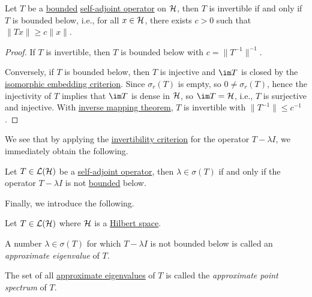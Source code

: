 \begin{lemma}\label{lma:invertibility-criterion}
	Let \(T\) be a \hyperref[rmk:bounded-op]{bounded} \hyperref[def:self-adjoint-op]{self-adjoint operator} on \(\mathcal{\MakeUppercase{h}} \), then \(T\) is invertible if and only if \(T\) is bounded below, i.e., for all \(x\in \mathcal{\MakeUppercase{h}} \), there exists \(c>0\) such that \(\lVert Tx \rVert \geq c\lVert x \rVert \).
\end{lemma}
\begin{proof}
	If \(T\) is invertible, then \(T\) is bounded below with \(c = \lVert T^{-1}  \rVert ^{-1} \).

	Conversely, if \(T\) is bounded below, then \(T\) is injective and \(\im T\) is closed by the \hyperref[prop:isomorphic-embedding]{isomorphic embedding criterion}. Since \(\sigma _r(T)\) is empty, so \(0 \neq \sigma _r(T)\), hence the injectivity of \(T\) implies that \(\im T\) is dense in \(\mathcal{\MakeUppercase{h}} \), so \(\im T=\mathcal{\MakeUppercase{h}} \), i.e., \(T\) is surjective and injective. With \hyperref[thm:inverse-mapping]{inverse mapping theorem}, \(T\) is invertible with \(\lVert T^{-1}  \rVert \leq c^{-1} \).
\end{proof}

We see that by applying the \hyperref[lma:invertibility-criterion]{invertibility criterion} for the operator \(T - \lambda I\), we immediately obtain the following.

\begin{corollary}\label{col:criterion-of-spectrum-points}
	Let \(T\in \mathcal{\MakeUppercase{l}} (\mathcal{\MakeUppercase{h}} )\) be a \hyperref[def:self-adjoint-op]{self-adjoint operator}, then \(\lambda \in \sigma (T)\) if and only if the operator \(T - \lambda I\) is not \hyperref[rmk:bounded-op]{bounded} below.
\end{corollary}

Finally, we introduce the following.

\begin{definition*}
	Let \(T\in \mathcal{\MakeUppercase{l}} (\mathcal{\MakeUppercase{h}} )\) where \(\mathcal{\MakeUppercase{h}} \) is a \hyperref[def:Hilbert-space]{Hilbert space}.
	\begin{definition}\label{def:approximate-eigenvalue}
		A number \(\lambda \in \sigma (T)\) for which \(T - \lambda I\) is not bounded below is called an \emph{approximate eigenvalue} of \(T\).
	\end{definition}
	\begin{definition}\label{def:approximate-point-spectrum}
		The set of all \hyperref[def:approximate-eigenvalue]{approximate eigenvalues} of \(T\) is called the \emph{approximate point spectrum} of \(T\).
	\end{definition}
\end{definition*}


